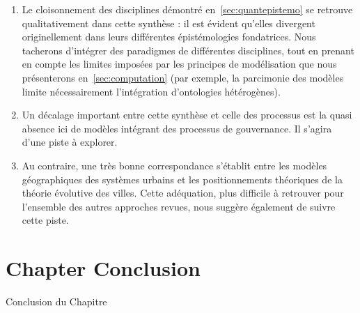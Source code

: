 {\begin{enumerate}
	\item Le cloisonnement des disciplines démontré en~\ref{sec:quantepistemo} se retrouve qualitativement dans cette synthèse : il est évident qu'elles divergent originellement dans leurs différentes épistémologies fondatrices. Nous tacherons d'intégrer des paradigmes de différentes disciplines, tout en prenant en compte les limites imposées par les principes de modélisation que nous présenterons en~\ref{sec:computation} (par exemple, la parcimonie des modèles limite nécessairement l'intégration d'ontologies hétérogènes).
	\item Un décalage important entre cette synthèse et celle des processus est la quasi absence ici de modèles intégrant des processus de gouvernance. Il s'agira d'une piste à explorer.
	\item Au contraire, une très bonne correspondance s'établit entre les modèles géographiques des systèmes urbains et les positionnements théoriques de la théorie évolutive des villes. Cette adéquation, plus difficile à retrouver pour l'ensemble des autres approches revues, nous suggère également de suivre cette piste.
\end{enumerate}
}






\newpage


\section*{Chapter Conclusion}{Conclusion du Chapitre}



